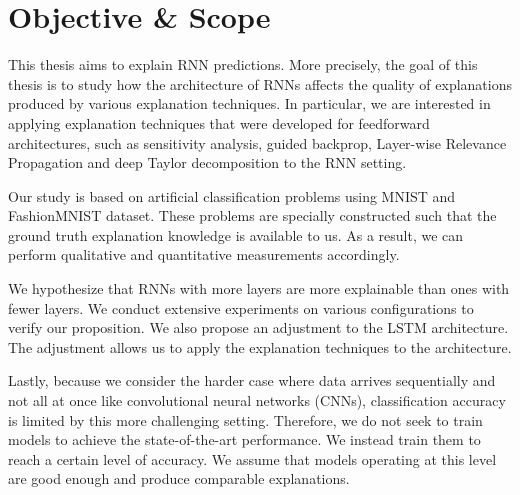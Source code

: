 \section{Objective \& Scope}
This thesis aims to explain RNN predictions. More precisely, the goal of this thesis is to study how the architecture of RNNs affects the quality of explanations produced by various explanation techniques. In particular, we are interested in applying explanation techniques that were developed for feedforward architectures, such as sensitivity analysis, guided backprop, Layer-wise Relevance Propagation and deep Taylor decomposition to the RNN setting. 

Our study is based on artificial classification problems using MNIST and FashionMNIST dataset. These problems are specially constructed such that the ground truth explanation knowledge is available to us. As a result, we can perform qualitative and quantitative measurements accordingly.


We hypothesize that RNNs with more layers are more explainable than ones with fewer layers. We conduct extensive experiments on various configurations to verify our proposition. We also propose an adjustment to the LSTM architecture. The adjustment allows us to apply the explanation techniques to the architecture.

Lastly, because we consider the harder case where data arrives sequentially and not all at once like convolutional neural networks (CNNs), classification accuracy is limited by this more challenging setting. Therefore, we do not seek to train models to achieve the state-of-the-art performance. We instead train them to reach a certain level of accuracy. We assume that models operating at this level are good enough and produce comparable explanations. 
%


%
%
%


